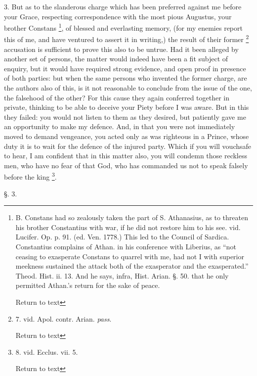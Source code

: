3. But as to the slanderous charge which has been preferred against me
before your Grace, respecting correspondence with the most pious
Augustus, your brother Constans \footnote{B. Constans had so zealously taken the part of S. Athanasius, as to
threaten his brother Constantius with war, if he did not restore him
to his see. vid. Lucifer. Op. p. 91. (ed. Ven. 1778.) This led to the
Council of Sardica. Constantius complains of Athan. in his conference
with Liberius, as ``not ceasing to exasperate Constans to quarrel with
me, had not I with superior meekness sustained the attack both of the
exasperator and the exasperated.'' Theod. Hist. ii. 13. And he says,
infra, Hist. Arian. §. 50. that he only permitted Athan.'s return for
the sake of peace.

Return to text}, of blessed and everlasting memory, (for my enemies report this
of me, and have ventured to assert it in writing,) the result of their
former \footnote{7. vid. Apol. contr. Arian. \emph{pass}.

Return to text} accusation is
sufficient to prove this also to be untrue. Had it been alleged by
another set of persons, the matter would indeed have been a fit
subject of enquiry, but it would have required strong evidence, and
open proof in presence of both parties: but when the same persons who
invented the former charge, are the authors also of this, is it
not reasonable to conclude from the issue of the one, the falsehood of
the other? For this cause they again conferred together in private,
thinking to be able to deceive your Piety before I was aware. But in
this they failed: you would not listen to them as they desired, but
patiently gave me an opportunity to make my defence. And, in that you
were not immediately moved to demand vengeance, you acted only as was
righteous in a Prince, whose duty it is to wait for the defence of the
injured party. Which if you will vouchsafe to hear, I am confident
that in this matter also, you will condemn those reckless men, who
have no fear of that God, who has commanded us not to speak falsely
before the king \footnote{8. vid. Ecclus. vii. 5.

Return to text}.

§. 3.

